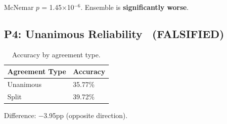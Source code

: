 McNemar $p$ = 1.45$\times$10$^{-6}$. Ensemble is \textbf{significantly worse}.

\subsection{P4: Unanimous Reliability \texttimes\ (FALSIFIED)}

\begin{table}[h]
\centering
\begin{tabular}{@{}ll@{}}
\toprule
Agreement Type & Accuracy \\
\midrule
Unanimous & 35.77\% \\
Split & 39.72\% \\
\bottomrule
\end{tabular}
\caption{Accuracy by agreement type.}
\label{tab:unanimous}
\end{table}

Difference: $-$3.95pp (opposite direction).
